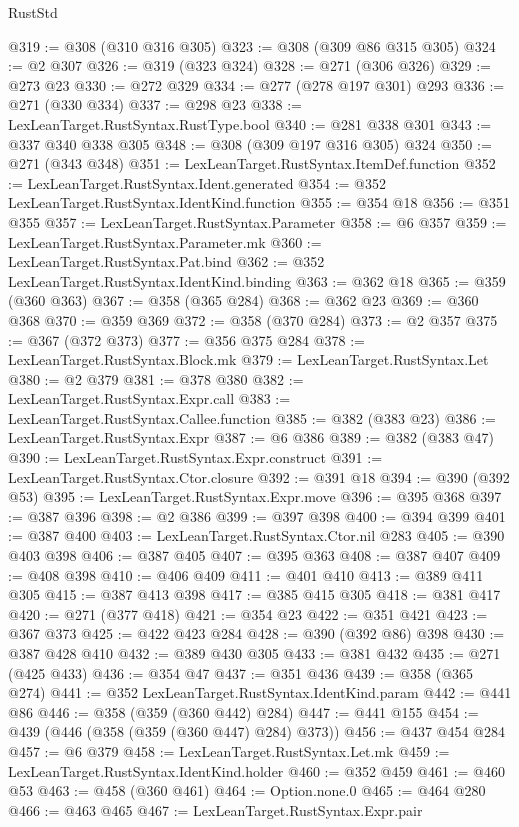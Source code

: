 \begin{lexlean}{RustStd}
\begin{coremodule}
@319 := @308 (@310 @316 @305)
@323 := @308 (@309 @86 @315 @305)
@324 := @2 @307
@326 := @319 (@323 @324)
@328 := @271 (@306 @326)
@329 := @273 @23
@330 := @272 @329
@334 := @277 (@278 @197 @301) @293
@336 := @271 (@330 @334)
@337 := @298 @23
@338 := LexLeanTarget.RustSyntax.RustType.bool
@340 := @281 @338 @301
@343 := @337 @340 @338 @305
@348 := @308 (@309 @197 @316 @305) @324
@350 := @271 (@343 @348)
@351 := LexLeanTarget.RustSyntax.ItemDef.function
@352 := LexLeanTarget.RustSyntax.Ident.generated
@354 := @352 LexLeanTarget.RustSyntax.IdentKind.function
@355 := @354 @18
@356 := @351 @355
@357 := LexLeanTarget.RustSyntax.Parameter
@358 := @6 @357
@359 := LexLeanTarget.RustSyntax.Parameter.mk
@360 := LexLeanTarget.RustSyntax.Pat.bind
@362 := @352 LexLeanTarget.RustSyntax.IdentKind.binding
@363 := @362 @18
@365 := @359 (@360 @363)
@367 := @358 (@365 @284)
@368 := @362 @23
@369 := @360 @368
@370 := @359 @369
@372 := @358 (@370 @284)
@373 := @2 @357
@375 := @367 (@372 @373)
@377 := @356 @375 @284
@378 := LexLeanTarget.RustSyntax.Block.mk
@379 := LexLeanTarget.RustSyntax.Let
@380 := @2 @379
@381 := @378 @380
@382 := LexLeanTarget.RustSyntax.Expr.call
@383 := LexLeanTarget.RustSyntax.Callee.function
@385 := @382 (@383 @23)
@386 := LexLeanTarget.RustSyntax.Expr
@387 := @6 @386
@389 := @382 (@383 @47)
@390 := LexLeanTarget.RustSyntax.Expr.construct
@391 := LexLeanTarget.RustSyntax.Ctor.closure
@392 := @391 @18
@394 := @390 (@392 @53)
@395 := LexLeanTarget.RustSyntax.Expr.move
@396 := @395 @368
@397 := @387 @396
@398 := @2 @386
@399 := @397 @398
@400 := @394 @399
@401 := @387 @400
@403 := LexLeanTarget.RustSyntax.Ctor.nil @283
@405 := @390 @403 @398
@406 := @387 @405
@407 := @395 @363
@408 := @387 @407
@409 := @408 @398
@410 := @406 @409
@411 := @401 @410
@413 := @389 @411 @305
@415 := @387 @413 @398
@417 := @385 @415 @305
@418 := @381 @417
@420 := @271 (@377 @418)
@421 := @354 @23
@422 := @351 @421
@423 := @367 @373
@425 := @422 @423 @284
@428 := @390 (@392 @86) @398
@430 := @387 @428 @410
@432 := @389 @430 @305
@433 := @381 @432
@435 := @271 (@425 @433)
@436 := @354 @47
@437 := @351 @436
@439 := @358 (@365 @274)
@441 := @352 LexLeanTarget.RustSyntax.IdentKind.param
@442 := @441 @86
@446 := @358 (@359 (@360 @442) @284)
@447 := @441 @155
@454 := @439 (@446 (@358 (@359 (@360 @447) @284) @373))
@456 := @437 @454 @284
@457 := @6 @379
@458 := LexLeanTarget.RustSyntax.Let.mk
@459 := LexLeanTarget.RustSyntax.IdentKind.holder
@460 := @352 @459
@461 := @460 @53
@463 := @458 (@360 @461)
@464 := Option.none.{0}
@465 := @464 @280
@466 := @463 @465
@467 := LexLeanTarget.RustSyntax.Expr.pair

\end{coremodule}
\end{lexlean}
